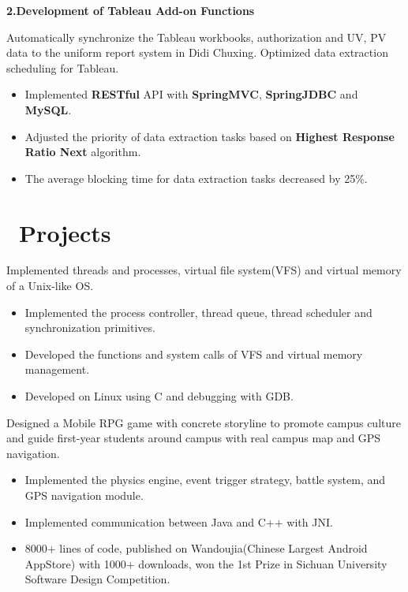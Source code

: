 \documentclass{resume}
\begin{document}
\textbf{2.Development of Tableau Add-on Functions}

Automatically synchronize the Tableau workbooks, authorization and UV, PV data to the uniform report system in Didi Chuxing. Optimized data extraction scheduling for Tableau.
\begin{itemize}
	\item Implemented \textbf{RESTful} API with \textbf{SpringMVC}, \textbf{SpringJDBC} and \textbf{MySQL}.
	\item Adjusted the priority of data extraction tasks based on \textbf{Highest Response Ratio Next} algorithm.  \item The average blocking time for data extraction tasks decreased by 25\%.
\end{itemize}


\section{\faInfo\ Projects}
Implemented threads and processes, virtual file system(VFS) and virtual memory of a Unix-like OS.
\begin{itemize}
  \item Implemented the process controller, thread queue, thread scheduler and synchronization primitives.
  \item Developed the functions and system calls of VFS and virtual memory management.
  \item Developed on Linux using C and debugging with GDB.
\end{itemize}

Designed a Mobile RPG game with concrete storyline to promote campus culture and guide first-year students around campus with real campus map and GPS navigation.
\begin{itemize}
  \item Implemented the physics engine, event trigger strategy, battle system, and GPS navigation module.
  \item Implemented communication between Java and C++ with JNI.
  \item 8000+ lines of code, published on Wandoujia(Chinese Largest Android AppStore) with 1000+ downloads, won the 1st Prize in Sichuan University Software Design Competition.
\end{itemize}
\end{document}
